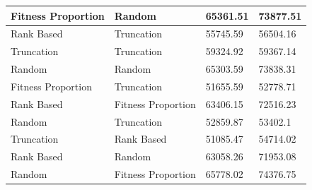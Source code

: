 \documentclass[11pt, letterpaper]{article}
\begin{document}
\begin{table}[!ht]
\begin{tabular}{|l|l|l|l|}
        Fitness Proportion & Random & 65361.51 & 73877.51 \\ \hline
        Rank Based & Truncation & 55745.59 & 56504.16 \\ \hline
        Truncation & Truncation & 59324.92 & 59367.14 \\ \hline
        Random & Random & 65303.59 & 73838.31 \\ \hline
        Fitness Proportion & Truncation & 51655.59 & 52778.71 \\ \hline
        Rank Based & Fitness Proportion & 63406.15 & 72516.23 \\ \hline
        Random & Truncation & 52859.87 & 53402.1 \\ \hline
        Truncation & Rank Based & 51085.47 & 54714.02 \\ \hline
        Rank Based & Random & 63058.26 & 71953.08 \\ \hline
        Random & Fitness Proportion & 65778.02 & 74376.75 \\ \hline
    \end{tabular}
\end{table}
\end{document}
